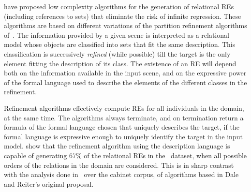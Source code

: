  have proposed low complexity algorithms for the generation 
of relational REs (including references to sets) that eliminate the risk of infinite regression. 
These algorithms are based on different variations of the partition refinement algorithms of~.
The information provided by a given scene is interpreted as a relational model whose 
objects are classified into sets that fit the same description.  
This classification is successively \emph{refined} (while possible) till the target 
is the only element fitting the description of its class.  The existence of an RE will 
depend both on the information available in the input scene, and on the expressive power of the formal 
language used to describe the elements of the different  classes in the refinement. 


Refinement algorithms %
effectively compute REs for all individuals in the domain, at the same time.  The algorithms always terminate, and on termination return a formula of 
the formal language chosen that uniquely describes the target, if the 
formal language is expressive enough to uniquely identify the target in the input model. 
show that the refinement algorithm using the description language \el  is capable of generating 67\% of 
the relational REs in the~\cite{viethen06:_algor_for_gener_refer_expres} dataset, when all possible orders of the relations in the domain are considered. This is in sharp contrast with the analysis 
done in~\cite{viethen06:_algor_for_gener_refer_expres} over the cabinet corpus, of algorithms based in Dale and Reiter's original proposal.    

